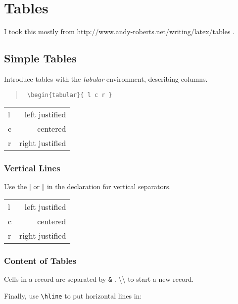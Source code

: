 
\chapter{Tables}
\label{tables} %

I took this mostly from http://www.andy-roberts.net/writing/latex/tables .

\section{Simple Tables}
\label{simple}

Introduce tables with the \emph{tabular} environment, describing columns.

\begin{quote}
	\texttt{ \textbackslash{}begin\{tabular\}\{ l c r \} }
\end{quote}

\begin{center}
	\begin{tabular}{ l r }
		l & left justified \\
		c & centered \\
		r & right justified \\
	\end{tabular}
\end{center}

\subsection{Vertical Lines}

Use the $\vert$ or $\Vert$ in the declaration for vertical separators.

\begin{center}
	\begin{tabular}{ l || r | }
		l & left justified \\
		c & centered \\
		r & right justified \\
	\end{tabular}
\end{center}

\subsection{Content of Tables}

Cells in a record are separated by \texttt{\&} .  
\textbackslash{}\textbackslash{} to start a new record.

Finally, use \texttt{\textbackslash{}hline} to put horizontal lines in:

